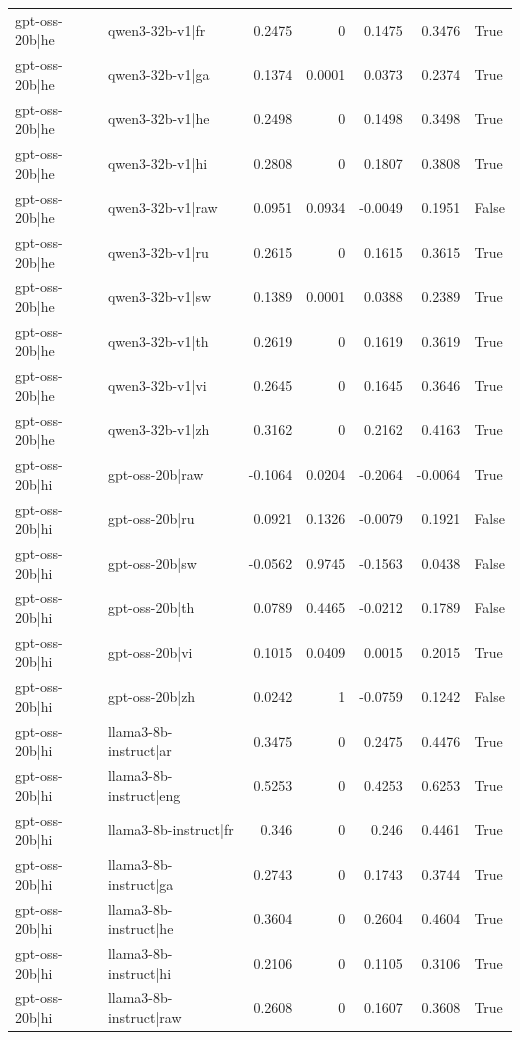 \begin{table}
\begin{tabular}{l l r r r r l}
gpt-oss-20b|he & qwen3-32b-v1|fr & 0.2475 & 0 & 0.1475 & 0.3476 & True \\
gpt-oss-20b|he & qwen3-32b-v1|ga & 0.1374 & 0.0001 & 0.0373 & 0.2374 & True \\
gpt-oss-20b|he & qwen3-32b-v1|he & 0.2498 & 0 & 0.1498 & 0.3498 & True \\
gpt-oss-20b|he & qwen3-32b-v1|hi & 0.2808 & 0 & 0.1807 & 0.3808 & True \\
gpt-oss-20b|he & qwen3-32b-v1|raw & 0.0951 & 0.0934 & -0.0049 & 0.1951 & False \\
gpt-oss-20b|he & qwen3-32b-v1|ru & 0.2615 & 0 & 0.1615 & 0.3615 & True \\
gpt-oss-20b|he & qwen3-32b-v1|sw & 0.1389 & 0.0001 & 0.0388 & 0.2389 & True \\
gpt-oss-20b|he & qwen3-32b-v1|th & 0.2619 & 0 & 0.1619 & 0.3619 & True \\
gpt-oss-20b|he & qwen3-32b-v1|vi & 0.2645 & 0 & 0.1645 & 0.3646 & True \\
gpt-oss-20b|he & qwen3-32b-v1|zh & 0.3162 & 0 & 0.2162 & 0.4163 & True \\
gpt-oss-20b|hi & gpt-oss-20b|raw & -0.1064 & 0.0204 & -0.2064 & -0.0064 & True \\
gpt-oss-20b|hi & gpt-oss-20b|ru & 0.0921 & 0.1326 & -0.0079 & 0.1921 & False \\
gpt-oss-20b|hi & gpt-oss-20b|sw & -0.0562 & 0.9745 & -0.1563 & 0.0438 & False \\
gpt-oss-20b|hi & gpt-oss-20b|th & 0.0789 & 0.4465 & -0.0212 & 0.1789 & False \\
gpt-oss-20b|hi & gpt-oss-20b|vi & 0.1015 & 0.0409 & 0.0015 & 0.2015 & True \\
gpt-oss-20b|hi & gpt-oss-20b|zh & 0.0242 & 1 & -0.0759 & 0.1242 & False \\
gpt-oss-20b|hi & llama3-8b-instruct|ar & 0.3475 & 0 & 0.2475 & 0.4476 & True \\
gpt-oss-20b|hi & llama3-8b-instruct|eng & 0.5253 & 0 & 0.4253 & 0.6253 & True \\
gpt-oss-20b|hi & llama3-8b-instruct|fr & 0.346 & 0 & 0.246 & 0.4461 & True \\
gpt-oss-20b|hi & llama3-8b-instruct|ga & 0.2743 & 0 & 0.1743 & 0.3744 & True \\
gpt-oss-20b|hi & llama3-8b-instruct|he & 0.3604 & 0 & 0.2604 & 0.4604 & True \\
gpt-oss-20b|hi & llama3-8b-instruct|hi & 0.2106 & 0 & 0.1105 & 0.3106 & True \\
gpt-oss-20b|hi & llama3-8b-instruct|raw & 0.2608 & 0 & 0.1607 & 0.3608 & True \\

\end{tabular}
\end{table}
